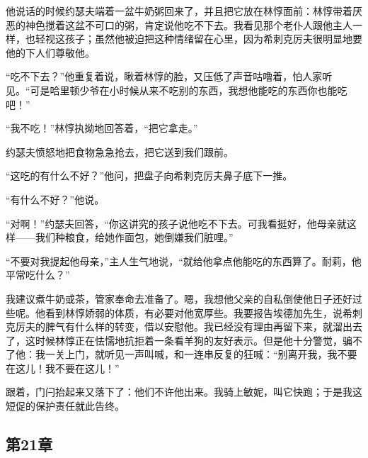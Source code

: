 \par 他说话的时候约瑟夫端着一盆牛奶粥回来了，并且把它放在林惇面前：林惇带着厌恶的神色搅着这盆不可口的粥，肯定说他吃不下去。我看见那个老仆人跟他主人一样，也轻视这孩子；虽然他被迫把这种情绪留在心里，因为希刺克厉夫很明显地要他的下人们尊敬他。
\par “吃不下去？”他重复着说，瞅着林惇的脸，又压低了声音咕噜着，怕人家听见。“可是哈里顿少爷在小时候从来不吃别的东西，我想他能吃的东西你也能吃吧！”
\par “我不吃！”林惇执拗地回答着，“把它拿走。”
\par 约瑟夫愤怒地把食物急急抢去，把它送到我们跟前。
\par “这吃的有什么不好？”他问，把盘子向希刺克厉夫鼻子底下一推。
\par “有什么不好？”他说。
\par “对啊！”约瑟夫回答，“你这讲究的孩子说他吃不下去。可我看挺好，他母亲就这样——我们种粮食，给她作面包，她倒嫌我们脏哩。”
\par “不要对我提起他母亲，”主人生气地说，“就给他拿点他能吃的东西算了。耐莉，他平常吃什么？”
\par 我建议煮牛奶或茶，管家奉命去准备了。嗯，我想他父亲的自私倒使他日子还好过些呢。他看到林惇娇弱的体质，有必要对他宽厚些。我要报告埃德加先生，说希刺克厉夫的脾气有什么样的转变，借以安慰他。我已经没有理由再留下来，就溜出去了，这时候林惇正在怯懦地抗拒着一条看羊狗的友好表示。但是他十分警觉，骗不了他：我一关上门，就听见一声叫喊，和一连串反复的狂喊：“别离开我，我不要在这儿！我不要在这儿！”
\par 跟着，门闩抬起来又落下了：他们不许他出来。我骑上敏妮，叫它快跑；于是我这短促的保护责任就此告终。


\subsection{第21章}

